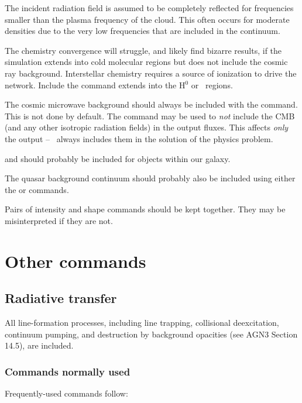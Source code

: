 \documentclass[12pt,twoside]{article}
\begin{document}
The incident radiation field is assumed to be completely reflected for frequencies
smaller than the plasma frequency of the cloud.  This often occurs for
moderate densities due to the very low frequencies that are included in
the continuum.

The chemistry convergence will struggle, and likely find bizarre results,
if the simulation extends into cold molecular regions but does not include
the cosmic ray background.  Interstellar chemistry requires a source
of ionization to drive the network.  
Include the  command
extends into the H$^0$ or \htwo\ regions.

The cosmic microwave background
should always be included with the 
command.  This is not done by default.
The command 
may be used to {\em not} include the CMB (and any other
isotropic radiation fields) in the output fluxes.
This affects {\em only} the output -- \Cloudy\ always
includes them in the solution of the physics problem.

 and  should probably be included for
objects within our galaxy.

The quasar background continuum
should probably also be included using
either the  or  commands.

Pairs of intensity and shape commands should be kept together.  They
may be misinterpreted if they are not.

\section{Other commands}
\label{sec:OtherCommands}

\subsection{Radiative transfer}

All line-formation processes, including line trapping, collisional
deexcitation, continuum pumping, and destruction by background opacities
(see AGN3 Section 14.5), are included.

\subsubsection{Commands normally used}

Frequently-used commands follow:
\end{document}
